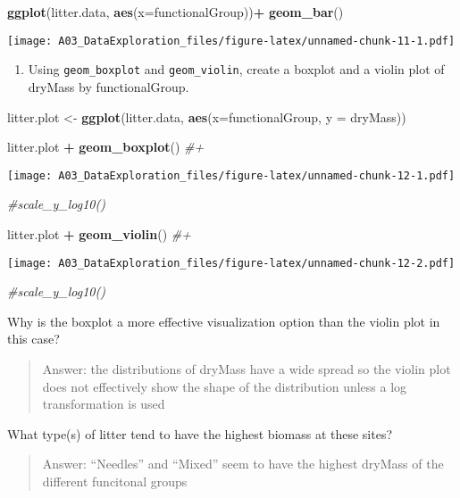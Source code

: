 \documentclass[
]{article}
\newenvironment{Shaded}{\begin{snugshade}}{\end{snugshade}}
\newcommand{\CommentTok}[1]{\textcolor[rgb]{0.56,0.35,0.01}{\textit{#1}}}
\newcommand{\DataTypeTok}[1]{\textcolor[rgb]{0.13,0.29,0.53}{#1}}
\newcommand{\KeywordTok}[1]{\textcolor[rgb]{0.13,0.29,0.53}{\textbf{#1}}}
\newcommand{\NormalTok}[1]{#1}
\newcommand{\OperatorTok}[1]{\textcolor[rgb]{0.81,0.36,0.00}{\textbf{#1}}}
\newcommand{\StringTok}[1]{\textcolor[rgb]{0.31,0.60,0.02}{#1}}
\providecommand{\tightlist}{%
  \setlength{\itemsep}{0pt}\setlength{\parskip}{0pt}}
\begin{document}
\begin{Shaded}
\begin{Highlighting}[]
\KeywordTok{ggplot}\NormalTok{(litter.data, }\KeywordTok{aes}\NormalTok{(}\DataTypeTok{x=}\NormalTok{functionalGroup))}\OperatorTok{+}
\StringTok{  }\KeywordTok{geom_bar}\NormalTok{()}
\end{Highlighting}
\end{Shaded}

\texttt{[image: A03\_DataExploration\_files/figure-latex/unnamed-chunk-11-1.pdf]}

\begin{enumerate}
\def\labelenumi{\arabic{enumi}.}
\setcounter{enumi}{14}
\tightlist
\item
  Using \texttt{geom\_boxplot} and \texttt{geom\_violin}, create a
  boxplot and a violin plot of dryMass by functionalGroup.
\end{enumerate}

\begin{Shaded}
\begin{Highlighting}[]
\NormalTok{litter.plot <-}\StringTok{ }\KeywordTok{ggplot}\NormalTok{(litter.data, }\KeywordTok{aes}\NormalTok{(}\DataTypeTok{x=}\NormalTok{functionalGroup, }\DataTypeTok{y =}\NormalTok{ dryMass))}

\NormalTok{litter.plot }\OperatorTok{+}
\StringTok{  }\KeywordTok{geom_boxplot}\NormalTok{() }\CommentTok{#+}
\end{Highlighting}
\end{Shaded}

\texttt{[image: A03\_DataExploration\_files/figure-latex/unnamed-chunk-12-1.pdf]}

\begin{Shaded}
\begin{Highlighting}[]
  \CommentTok{#scale_y_log10()}

\NormalTok{litter.plot }\OperatorTok{+}
\StringTok{  }\KeywordTok{geom_violin}\NormalTok{() }\CommentTok{#+}
\end{Highlighting}
\end{Shaded}

\texttt{[image: A03\_DataExploration\_files/figure-latex/unnamed-chunk-12-2.pdf]}

\begin{Shaded}
\begin{Highlighting}[]
  \CommentTok{#scale_y_log10()}
\end{Highlighting}
\end{Shaded}

Why is the boxplot a more effective visualization option than the violin
plot in this case?

\begin{quote}
Answer: the distributions of dryMass have a wide spread so the violin
plot does not effectively show the shape of the distribution unless a
log transformation is used
\end{quote}

What type(s) of litter tend to have the highest biomass at these sites?

\begin{quote}
Answer: ``Needles'' and ``Mixed'' seem to have the highest dryMass of
the different funcitonal groups
\end{quote}
\end{document}
